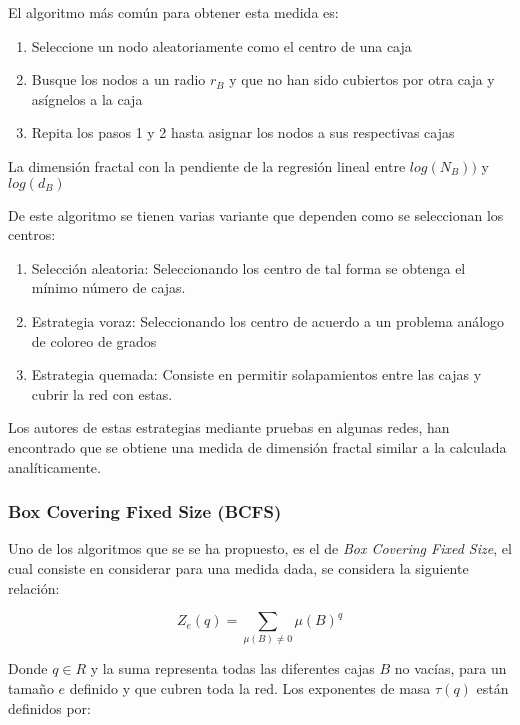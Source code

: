 El algoritmo más común para obtener esta medida es:

\begin{enumerate}
    \item Seleccione un nodo aleatoriamente como el centro de una caja
    \item Busque los nodos a un radio $r_B$ y que no han sido cubiertos por otra caja y asígnelos a la caja
    \item Repita los pasos 1 y 2 hasta asignar los nodos a sus respectivas cajas
\end{enumerate}

La dimensión fractal con la pendiente de la regresión lineal entre $log(N_B))$ y $log(d_B)$

De este algoritmo se tienen varias variante que dependen como se seleccionan los centros:

\begin{enumerate}
    \item Selección aleatoria\cite{Kim2007B}: Seleccionando los centro de tal forma se obtenga el mínimo número de cajas.
    \item Estrategia voraz\cite{Song2007}: Seleccionando los centro de acuerdo a un problema análogo de coloreo de grados
    \item Estrategia quemada\cite{Song2007}: Consiste en permitir solapamientos entre las cajas  y cubrir la red con estas.
\end{enumerate}

Los autores de estas estrategias mediante pruebas en algunas redes, han encontrado que se obtiene una medida de dimensión fractal similar a la calculada analíticamente.



\subsubsection{Box Covering Fixed Size (BCFS)}

Uno de los algoritmos que se se ha propuesto, es el de \textit{Box Covering Fixed Size}\cite{Halsey1986}\cite{RendondelaTorre2017}\cite{Yu2003}, el cual consiste en considerar para una medida dada, se considera la siguiente relación:

\begin{equation}
    Z_e(q) =  \sum \limits_{\mu(B) \neq 0} \mu(B)^q
\end{equation}

Donde $q\in R$ y la suma representa todas las diferentes cajas $B$ no vacías, para un tamaño $e$ definido y que cubren toda la red. Los exponentes de masa $\tau(q)$ están definidos por:

